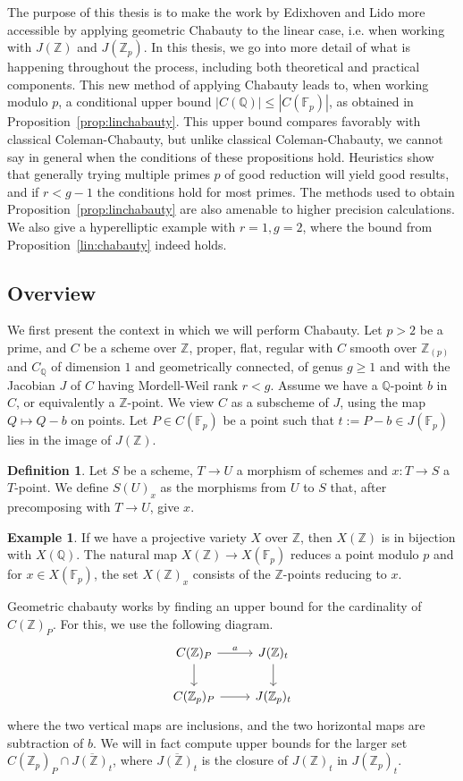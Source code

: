 \documentclass[12pt]{article}
\newcommand{\Z}{\mathbb{Z}}
\newcommand{\Q}{\mathbb{Q}}
\newcommand{\F}{\mathbb{F}}
\theoremstyle{plain}
\theoremstyle{definition}
\newtheorem{defn}[thm]{Definition} %
\newtheorem{exmp}[thm]{Example} %
\theoremstyle{remark}
\begin{document}
The purpose of this thesis is to make the work by Edixhoven and Lido more accessible by applying geometric Chabauty to the linear case, i.e. when working with $J(\Z)$ and $J(\Z_p)$. In this thesis, we go into more detail of what is happening throughout the process, including both theoretical and practical components. This new method of applying Chabauty leads to, when working modulo $p$, a conditional upper bound $|C(\Q)| \leq |C(\F_p)|$, as obtained in Proposition~\ref{prop:linchabauty}. This upper bound compares favorably with classical Coleman-Chabauty, but unlike classical Coleman-Chabauty, we cannot say in general when the conditions of these propositions hold. Heuristics show that generally trying multiple primes $p$ of good reduction will yield good results, and if $r < g-1$ the conditions hold for most primes. The methods used to obtain Proposition~\ref{prop:linchabauty} are also amenable to higher precision calculations. We also give a hyperelliptic example with $r = 1, g = 2$, where the bound from Proposition~\ref{lin:chabauty} indeed holds. 

\subsection{Overview}
We first present the context in which we will perform Chabauty. Let $p>2$ be a prime, and $C$ be a scheme over $\Z$, proper, flat, regular with $C$ smooth over $\Z_{(p)}$ and $C_\Q$ of dimension $1$ and geometrically connected, of genus $g \geq 1$ and with the Jacobian $J$ of $C$ having Mordell-Weil rank $r < g$. Assume we have a $\Q$-point $b$ in $C$, or equivalently a $\Z$-point. We view $C$ as a subscheme of $J$, using the map $Q \mapsto Q - b$ on points. Let $P \in C(\F_p)$ be a point such that $t := P - b \in J(\F_p)$ lies in the image of $J(\Z)$.

\begin{defn}
Let $S$ be a scheme, $T \to U$ a morphism of schemes and $x : T \to S$ a $T$-point. We define $S(U)_x$ as the morphisms from $U$ to $S$ that, after precomposing with $T \to U$, give $x$.
\end{defn}
\begin{exmp}
If we have a projective variety $X$ over $\Z$, then $X(\Z)$ is in bijection with $X(\Q)$. The natural map $X(\Z) \to X(\F_p)$ reduces a point modulo $p$ and for $x \in X(\F_p)$, the set $X(\Z)_x$ consists of the $\Z$-points reducing to $x$.
\end{exmp}

Geometric chabauty works by finding an upper bound for the cardinality of $C(\Z)_P$. For this, we use the following diagram.
\[
\begin{tikzcd}
C(\Z)_P \arrow[d] \arrow[r, "a"] & J(\Z)_t \arrow[d] \\
C(\Z_p)_P \arrow[r]              & J(\Z_p)_t        
\end{tikzcd}
\]
where the two vertical maps are inclusions, and the two horizontal maps are subtraction of $b$. We will in fact compute upper bounds for the larger set $C(\Z_p)_P \cap \overline{J(\Z)_t}$, where $\overline{J(\Z)_t}$ is the closure of $J(\Z)_t$ in $J(\Z_p)_t$. 
\end{document}
